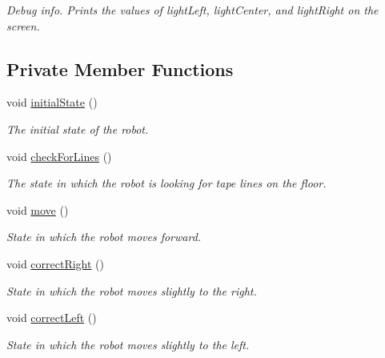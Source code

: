 \begin{DoxyCompactItemize}
\begin{DoxyCompactList}\small\item\em Debug info. Prints the values of lightLeft, lightCenter, and lightRight on the screen. \item\end{DoxyCompactList}\end{DoxyCompactItemize}
\subsection*{Private Member Functions}
\begin{DoxyCompactItemize}
\item 
void \hyperlink{class_r_j_f_r_c2011_1_1_autonomous_ac23ae3c557b0a664d5f079b16c6f58df}{initialState} ()
\begin{DoxyCompactList}\small\item\em The initial state of the robot. \item\end{DoxyCompactList}\item 
void \hyperlink{class_r_j_f_r_c2011_1_1_autonomous_a8c231a2395b4fc03bb3d0dcbda53113d}{checkForLines} ()
\begin{DoxyCompactList}\small\item\em The state in which the robot is looking for tape lines on the floor. \item\end{DoxyCompactList}\item 
void \hyperlink{class_r_j_f_r_c2011_1_1_autonomous_a68c0b61b84e4e095b6463cadc275adae}{move} ()
\begin{DoxyCompactList}\small\item\em State in which the robot moves forward. \item\end{DoxyCompactList}\item 
void \hyperlink{class_r_j_f_r_c2011_1_1_autonomous_a4558410db180891d594a40eeedc9b09f}{correctRight} ()
\begin{DoxyCompactList}\small\item\em State in which the robot moves slightly to the right. \item\end{DoxyCompactList}\item 
void \hyperlink{class_r_j_f_r_c2011_1_1_autonomous_a6de9f09a6b3304e67829e7b0b6ba3862}{correctLeft} ()
\begin{DoxyCompactList}\small\item\em State in which the robot moves slightly to the left. \item\end{DoxyCompactList}\item 

\end{DoxyCompactItemize}
